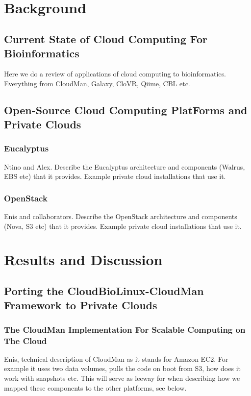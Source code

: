 \documentclass[10pt]{bmc_article}
\newenvironment{bmcformat}{\baselineskip20pt\sloppy\setboolean{publ}{false}}{\baselineskip20pt\sloppy}
\begin{document}
\begin{bmcformat}
\section*{Background}
\subsection*{Current State of Cloud Computing For Bioinformatics}
Here we do a review of applications of cloud computing to bioinformatics. Everything from CloudMan, Galaxy, CloVR, Qiime, CBL etc. \pb

\subsection*{Open-Source Cloud Computing PlatForms and Private Clouds} 

\subsubsection*{Eucalyptus}
Ntino and Alex. Describe the Eucalyptus architecture and components (Walrus, EBS etc) that it provides. 
Example private cloud installations that use it. \pb


\subsubsection*{OpenStack}
Enis and collaborators. Describe the OpenStack architecture and components (Nova, S3 etc) that it provides.
Example private cloud installations that use it. \pb



\section*{Results and Discussion}


\subsection*{Porting the CloudBioLinux-CloudMan Framework to Private Clouds} 

\subsubsection*{The CloudMan Implementation For Scalable Computing on The Cloud}
Enis, technical description of CloudMan as it stands for Amazon EC2. For example it uses two data volumes,
pulls the code on boot from S3, how does it work with snapshots etc. This will serve as leeway for when describing
how we mapped these components to the other platforms, see below. \pb


\end{bmcformat}
\end{document}
